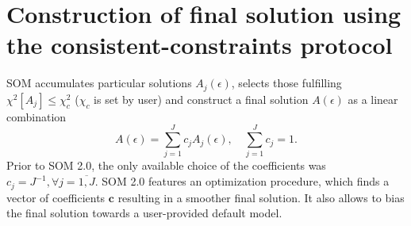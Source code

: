 \documentclass[]{article}
\begin{document}
\section{Construction of final solution using the consistent-constraints protocol}
\label{final_solution_cc}

SOM accumulates particular solutions $A_j(\epsilon)$, selects those
fulfilling $\chi^2[A_j] \leq \chi^2_c$ ($\chi_c$ is set by user) and construct a final solution $A(\epsilon)$ as a linear combination
\begin{equation}
    A(\epsilon) = \sum_{j=1}^J c_j A_j(\epsilon), \quad
    \sum_{j=1}^J c_j = 1.
\end{equation}
Prior to SOM 2.0, the only available choice of the coefficients was $c_j = J^{-1}, \forall j=\overline{1,J}$. SOM 2.0 features an optimization procedure, which finds a vector of coefficients $\mathbf{c}$ resulting in a smoother final solution. It also allows to bias the final solution towards a user-provided default model.
\end{document}
